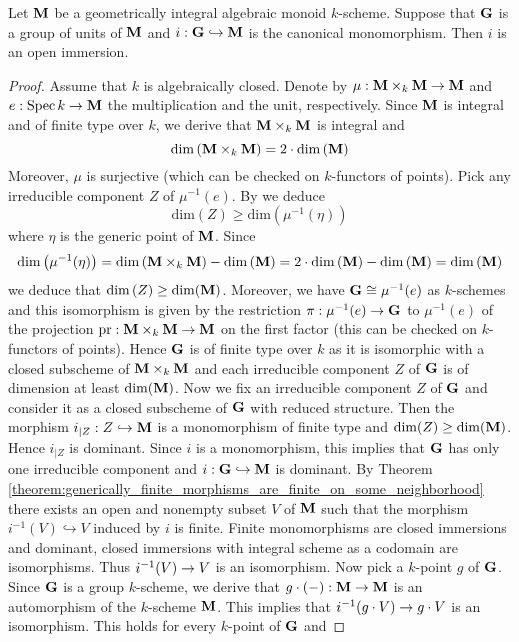 \begin{theorem}\label{theorem:units_are_open_in_a_geometrically_integral_monoid}
Let $\mathbf{M}$ be a geometrically integral algebraic monoid $k$-scheme. Suppose that $\mathbf{G}$ is a group of units of $\mathbf{M}$ and $i:\mathbf{G}\hookrightarrow \mathbf{M}$ is the canonical monomorphism. Then $i$ is an open immersion.
\end{theorem}
\begin{proof}
Assume that $k$ is algebraically closed. Denote by $\mu:\mathbf{M}\times_k\mathbf{M}\rightarrow \mathbf{M}$ and $e:\mathrm{Spec}\, k\rightarrow \mathbf{M}$ the multiplication and the unit, respectively. Since $\mathbf{M}$ is integral and of finite type over $k$, we derive that $\mathbf{M}\times_k\mathbf{M}$ is integral and
$$\mathrm{dim}\left(\mathbf{M}\times_k\mathbf{M}\right) = 2\cdot \mathrm{dim}\left(\mathbf{M}\right)$$
Moreover, $\mu$ is surjective (which can be checked on $k$-functors of points). Pick any irreducible component $Z$ of $\mu^{-1}(e)$. By {\cite[Lemma 14.109]{gortz2010algebraic}} we deduce $$\mathrm{dim}\left(Z\right) \geq \mathrm{dim}\left(\mu^{-1}(\eta)\right)$$
where $\eta$ is the generic point of $\mathbf{M}$. Since 
$$\mathrm{dim}\left(\mu^{-1}(\eta)\right) = \mathrm{dim}\left(\mathbf{M}\times_k\mathbf{M}\right) - \mathrm{dim}\left(\mathbf{M}\right) =  2\cdot \mathrm{dim}\left(\mathbf{M}\right) - \mathrm{dim}\left(\mathbf{M}\right) = \mathrm{dim}\left(\mathbf{M}\right)$$
we deduce that $\mathrm{dim}\left(Z\right) \geq \mathrm{dim}(\mathbf{M})$. Moreover, we have $\mathbf{G} \cong \mu^{-1}(e)$ as $k$-schemes and this isomorphism is given by the restriction $\pi:\mu^{-1}(e)\rightarrow \mathbf{G}$ to $\mu^{-1}(e)$ of the projection $\mathrm{pr}:\mathbf{M}\times_k\mathbf{M}\rightarrow \mathbf{M}$ on the first factor (this can be checked on $k$-functors of points). Hence $\mathbf{G}$ is of finite type over $k$ as it is isomorphic with a closed subscheme of $\mathbf{M}\times_k\mathbf{M}$ and each irreducible component $Z$ of $\mathbf{G}$ is of dimension at least $ \mathrm{dim}(\mathbf{M})$. Now we fix an irreducible component $Z$ of $\mathbf{G}$ and consider it as a closed subscheme of $\mathbf{G}$ with reduced structure. Then the morphism $i_{\mid Z}:Z\hookrightarrow \mathbf{M}$ is a monomorphism of finite type and $\mathrm{dim}(Z) \geq \mathrm{dim}(\mathbf{M})$. Hence $i_{\mid Z}$ is dominant. Since $i$ is a monomorphism, this implies that $\mathbf{G}$ has only one irreducible component and $i:\mathbf{G}\hookrightarrow \mathbf{M}$ is dominant. By Theorem \ref{theorem:generically_finite_morphisms_are_finite_on_some_neighborhood} there exists an open and nonempty subset $V$ of $\mathbf{M}$ such that the morphism $i^{-1}(V)\hookrightarrow V$ induced by $i$ is finite. Finite monomorphisms are closed immersions and dominant, closed immersions with integral scheme as a codomain are isomorphisms. Thus $i^{-1}(V)\rightarrow V$ is an isomorphism. Now pick a $k$-point $g$ of $\mathbf{G}$. Since $\mathbf{G}$ is a group $k$-scheme, we derive that $g\cdot (-):\mathbf{M}\rightarrow \mathbf{M}$ is an automorphism of the $k$-scheme $\mathbf{M}$. This implies that $i^{-1}(g \cdot V)\rightarrow g\cdot V$ is an isomorphism. This holds for every $k$-point of $\mathbf{G}$ and 

\end{proof}
